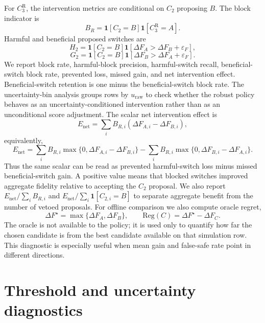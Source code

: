 \documentclass[11pt]{article}
\numberwithin{equation}{section}
\begin{document}
For $C_3^{\mathrm R}$, the intervention metrics are conditional on $C_2$ proposing
$B$. The block indicator is
\begin{equation}
B_R=\mathbf{1}[C_2=B]\mathbf{1}[C_3^{\mathrm R}=A].
\end{equation}
Harmful and beneficial proposed switches are
\begin{equation}
H_2=\mathbf{1}[C_2=B]\mathbf{1}[\Delta F_A>\Delta F_B+\varepsilon_F],
\end{equation}
\begin{equation}
G_2=\mathbf{1}[C_2=B]\mathbf{1}[\Delta F_B>\Delta F_A+\varepsilon_F].
\end{equation}
We report block rate, harmful-block precision, harmful-switch recall,
beneficial-switch block rate, prevented loss, missed gain, and net intervention
effect.  Beneficial-switch retention is one minus the beneficial-switch block
rate. The uncertainty-bin analysis groups rows by $u_{\mathrm{raw}}$ to check
whether the robust policy behaves as an uncertainty-conditioned intervention rather
than as an unconditional score adjustment.
The scalar net intervention effect is
\begin{equation}
E_{\mathrm{net}}
=
\sum_i B_{R,i}(\Delta F_{A,i}-\Delta F_{B,i}),
\end{equation}
equivalently,
\begin{equation}
E_{\mathrm{net}}
=
\sum_i B_{R,i}\max\{0,\Delta F_{A,i}-\Delta F_{B,i}\}
-
\sum_i B_{R,i}\max\{0,\Delta F_{B,i}-\Delta F_{A,i}\}.
\end{equation}
Thus the same scalar can be read as prevented harmful-switch loss minus missed
beneficial-switch gain. A positive value means that blocked switches improved
aggregate fidelity relative to accepting the $C_2$ proposal. We also report
$E_{\mathrm{net}}/\sum_i B_{R,i}$ and
$E_{\mathrm{net}}/\sum_i\mathbf{1}[C_{2,i}=B]$ to separate aggregate benefit from
the number of vetoed proposals.
For offline comparison we also compute oracle regret,
\begin{equation}
\Delta F^\star=\max\{\Delta F_A,\Delta F_B\},
\qquad
\mathrm{Reg}(C)=\Delta F^\star-\Delta F_C.
\end{equation}
The oracle is not available to the policy; it is used only to quantify how far the
chosen candidate is from the best candidate available on that simulation row. This
diagnostic is especially useful when mean gain and false-safe rate point in
different directions.

\section{Threshold and uncertainty diagnostics}
\end{document}
